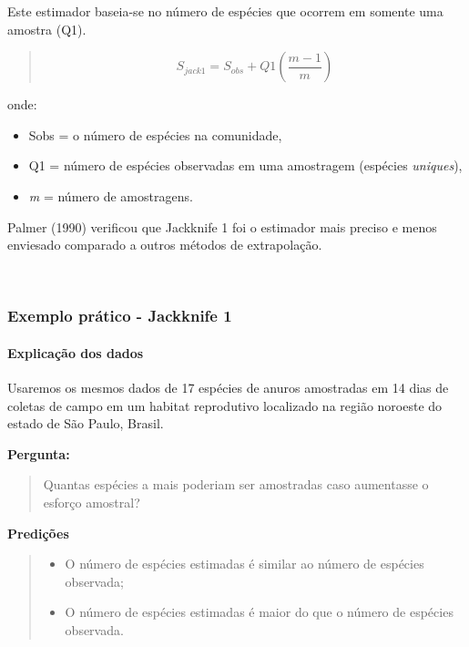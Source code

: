 \documentclass[
]{book}
\providecommand{\tightlist}{%
  \setlength{\itemsep}{0pt}\setlength{\parskip}{0pt}}
\begin{document}
Este estimador baseia-se no número de espécies que ocorrem em somente uma amostra (Q1).

\begin{quote}
\[S_{jack1} = S_{obs} + Q1\left(\frac{m - 1}{m}\right)\]
\end{quote}

onde:

\begin{itemize}
\item
  Sobs = o número de espécies na comunidade,
\item
  Q1 = número de espécies observadas em uma amostragem (espécies \emph{uniques}),
\item
  \emph{m} = número de amostragens.
\end{itemize}

Palmer (1990) verificou que Jackknife 1 foi o estimador mais preciso e menos enviesado comparado a outros métodos de extrapolação.

~

\hypertarget{exemplo-pruxe1tico---jackknife-1}{%
\subsubsection{Exemplo prático - Jackknife 1}\label{exemplo-pruxe1tico---jackknife-1}}

\hypertarget{explicauxe7uxe3o-dos-dados-3}{%
\paragraph{Explicação dos dados}\label{explicauxe7uxe3o-dos-dados-3}}

Usaremos os mesmos dados de 17 espécies de anuros amostradas em 14 dias de coletas de campo em um habitat reprodutivo localizado na região noroeste do estado de São Paulo, Brasil.

\textbf{Pergunta:}

\begin{quote}
Quantas espécies a mais poderiam ser amostradas caso aumentasse o esforço amostral?
\end{quote}

\textbf{Predições}

\begin{quote}
\begin{itemize}
\tightlist
\item
  O número de espécies estimadas é similar ao número de espécies observada;
\item
  O número de espécies estimadas é maior do que o número de espécies observada.
\end{itemize}
\end{quote}
\end{document}
